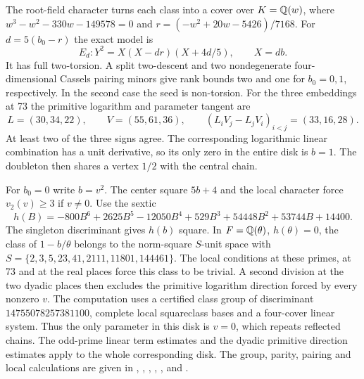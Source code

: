 The root-field character turns each class into a cover over
$K=\mathbb Q(w)$, where $w^3-w^2-330w-149578=0$ and
$r=(-w^2+20w-5426)/7168$. For $d=5(b_0-r)$ the exact model is
\[
 E_d:Y^2=X(X-dr)(X+4d/5),\qquad X=db.
\]
It has full two-torsion. A split two-descent and two nondegenerate
four-dimensional Cassels pairing minors give rank bounds two and one for
$b_0=0,1$, respectively. In the second case the seed is non-torsion.
For the three embeddings at 73 the primitive logarithm and parameter tangent
are
\[
 L=(30,34,22),\qquad V=(55,61,36),\qquad
 (L_iV_j-L_jV_i)_{i<j}=(33,16,28).
\]
At least two of the three signs agree. The corresponding logarithmic
linear combination has a unit derivative, so its only zero in the entire
disk is $b=1$. The doubleton then shares a vertex $1/2$ with the central
chain.

For $b_0=0$ write $b=v^2$. The center square $5b+4$ and the local character
force $v_2(v)\geq3$ if $v\ne0$. Use the sextic
\[
 h(B)=-800B^6+2625B^5-12050B^4+529B^3+54448B^2+53744B+14400.
\]
The singleton discriminant gives $h(b)$ square. In $F=\mathbb Q(\theta)$,
$h(\theta)=0$, the class of $1-b/\theta$ belongs to the norm-square
$S$-unit space with
$S=\{2,3,5,23,41,2111,11801,144461\}$. The local conditions at these
primes, at 73 and at the real places force this class to be trivial.
A second division at the two dyadic places then excludes the primitive
logarithm direction forced by every nonzero $v$. The computation uses a
certified class group of discriminant $14755078257381100$, complete local
squareclass bases and a four-cover linear system. Thus the only parameter
in this disk is $v=0$, which repeats reflected chains. The odd-prime
linear term estimates and the dyadic primitive direction estimates apply
to the whole corresponding disk.
The group, parity, pairing and local calculations are given in
, ,
, ,
,  and
.

